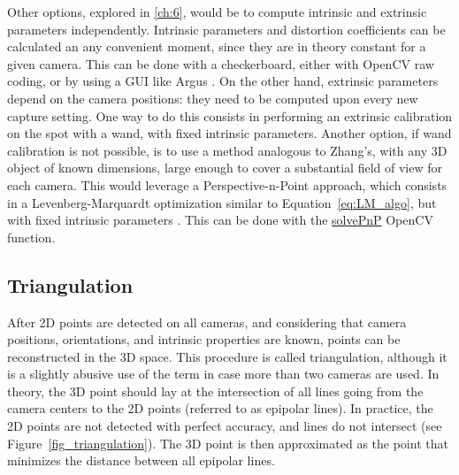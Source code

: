 Other options, explored in \autoref{ch:6}, would be to compute intrinsic and extrinsic parameters independently. Intrinsic parameters and distortion coefficients can be calculated an any convenient moment, since they are in theory constant for a given camera. This can be done with a checkerboard, either with OpenCV raw coding, or by using a GUI like Argus \cite{Argus}. On the other hand, extrinsic parameters depend on the camera positions: they need to be computed upon every new capture setting. One way to do this consists in performing an extrinsic calibration on the spot with a wand, with fixed intrinsic parameters. Another option, if wand calibration is not possible, is to use a method analogous to Zhang's, with any 3D object of known dimensions, large enough to cover a substantial field of view for each camera. This would leverage a Perspective-n-Point approach, which consists in a Levenberg-Marquardt optimization similar to Equation~\ref{eq:LM_algo}, but with fixed intrinsic parameters \cite{Marchand2015}. This can be done with the \href{https://docs.opencv.org/4.x/d9/d0c/group__calib3d.html#ga549c2075fac14829ff4a58bc931c033d}{solvePnP} OpenCV function. 



\newpage
\subsection{Triangulation}\label{triangulation}
 
After 2D points are detected on all cameras, and considering that camera positions, orientations, and intrinsic properties are known, points can be reconstructed in the 3D space. This procedure is called triangulation, although it is a slightly abusive use of the term in case more than two cameras are used. In theory, the 3D point should lay at the intersection of all lines going from the camera centers to the 2D points (referred to as epipolar lines). In practice, the 2D points are not detected with perfect accuracy, and lines do not intersect (see Figure~\ref{fig_triangulation}). The 3D point is then approximated as the point that minimizes the distance between all epipolar lines.

